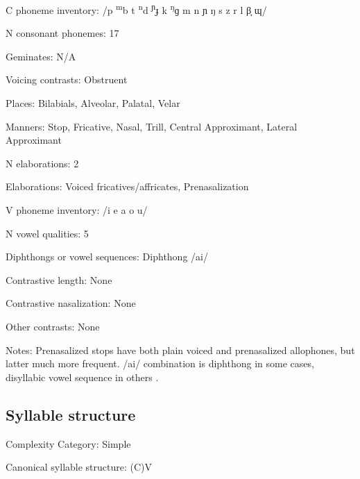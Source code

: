 {\begin{appendixdesc}
\item[C phoneme inventory:] /p \textsuperscript{m}b t \textsuperscript{n}d \textsuperscript{ɲ}ɟ k \textsuperscript{ŋ}ɡ m n ɲ ŋ s z r l β̞ ɰ/

\item[N consonant phonemes:] 17

\item[Geminates:] N/A

\item[Voicing contrasts:] Obstruent

\item[Places:] Bilabials, Alveolar, Palatal, Velar

\item[Manners:] Stop, Fricative, Nasal, Trill, Central Approximant, Lateral Approximant

\item[N elaborations:] 2

\item[Elaborations:] Voiced fricatives/affricates, Prenasalization

\item[V phoneme inventory:] /i e a o u/

\item[N vowel qualities:] 5

\item[Diphthongs or vowel sequences:] Diphthong /ai/

\item[Contrastive length:] None

\item[Contrastive nasalization:] None

\item[Other contrasts:] None

\item[Notes:] Prenasalized stops have both plain voiced and prenasalized allophones, but latter much more frequent. /ai/ combination is diphthong in some cases, disyllabic vowel sequence in others \citep[22]{Wegener2008}.
\end{appendixdesc}
\subsection*{Syllable structure}
\begin{appendixdesc}

\item[Complexity Category:] Simple

\item[Canonical syllable structure:] (C)V \citep[23--24]{Wegener2008}


\end{appendixdesc}}
